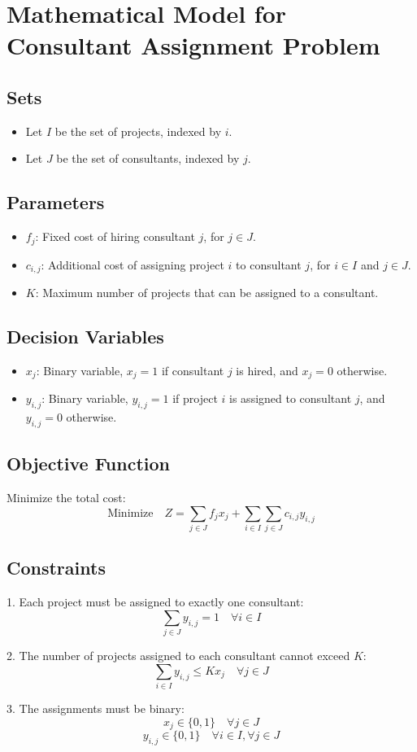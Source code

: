 \documentclass{article}
\begin{document}
\section*{Mathematical Model for Consultant Assignment Problem}

\subsection*{Sets}
\begin{itemize}
    \item Let \( I \) be the set of projects, indexed by \( i \).
    \item Let \( J \) be the set of consultants, indexed by \( j \).
\end{itemize}

\subsection*{Parameters}
\begin{itemize}
    \item \( f_j \): Fixed cost of hiring consultant \( j \), for \( j \in J \).
    \item \( c_{i,j} \): Additional cost of assigning project \( i \) to consultant \( j \), for \( i \in I \) and \( j \in J \).
    \item \( K \): Maximum number of projects that can be assigned to a consultant.
\end{itemize}

\subsection*{Decision Variables}
\begin{itemize}
    \item \( x_{j} \): Binary variable, \( x_{j} = 1 \) if consultant \( j \) is hired, and \( x_{j} = 0 \) otherwise.
    \item \( y_{i,j} \): Binary variable, \( y_{i,j} = 1 \) if project \( i \) is assigned to consultant \( j \), and \( y_{i,j} = 0 \) otherwise.
\end{itemize}

\subsection*{Objective Function}
Minimize the total cost:
\[
\text{Minimize} \quad Z = \sum_{j \in J} f_j x_j + \sum_{i \in I} \sum_{j \in J} c_{i,j} y_{i,j}
\]

\subsection*{Constraints}
1. Each project must be assigned to exactly one consultant:
\[
\sum_{j \in J} y_{i,j} = 1 \quad \forall i \in I
\]

2. The number of projects assigned to each consultant cannot exceed \( K \):
\[
\sum_{i \in I} y_{i,j} \leq K x_j \quad \forall j \in J
\]

3. The assignments must be binary:
\[
x_j \in \{0,1\} \quad \forall j \in J
\]
\[
y_{i,j} \in \{0,1\} \quad \forall i \in I, \forall j \in J
\]
\end{document}
